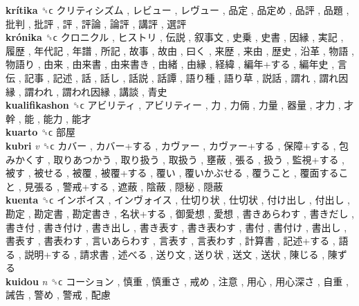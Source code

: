 \textbf{krítika} ␝ϲ   クリティシズム ,  レビュー ,  レヴュー ,  品定 ,  品定め ,  品評 ,  品題 ,  批判 ,  批評 ,  評 ,  評論 ,  論評 ,  講評 ,  選評   \\
\textbf{krónika} ␝ϲ   クロニクル ,  ヒストリ ,  伝説 ,  叙事文 ,  史乗 ,  史書 ,  因縁 ,  実記 ,  履歴 ,  年代記 ,  年譜 ,  所記 ,  故事 ,  故由 ,  曰く ,  来歴 ,  来由 ,  歴史 ,  沿革 ,  物語 ,  物語り ,  由来 ,  由来書 ,  由来書き ,  由緒 ,  由縁 ,  経緯 ,  編年+する ,  編年史 ,  言伝 ,  記事 ,  記述 ,  話 ,  話し ,  話説 ,  話譚 ,  語り種 ,  語り草 ,  説話 ,  謂れ ,  謂れ因縁 ,  謂われ ,  謂われ因縁 ,  講談 ,  青史   \\
\textbf{kualifikashon} ␝ϲ   アビリティ ,  アビリティー ,  力 ,  力倆 ,  力量 ,  器量 ,  才力 ,  才幹 ,  能 ,  能力 ,  能才   \\
\textbf{kuarto} ␝ϲ   部屋   \\
\textbf{kubri} \emph{v}  ␝ϲ   カバー ,  カバー+する ,  カヴァー ,  カヴァー+する ,  保障+する ,  包みかくす ,  取りあつかう ,  取り扱う ,  取扱う ,  壅蔽 ,  張る ,  扱う ,  監視+する ,  被す ,  被せる ,  被覆 ,  被覆+する ,  覆い ,  覆いかぶせる ,  覆うこと ,  覆面すること ,  見張る ,  警戒+する ,  遮蔽 ,  陰蔽 ,  隠秘 ,  隠蔽   \\
\textbf{kuenta} ␝ϲ   インボイス ,  インヴォイス ,  仕切り状 ,  仕切状 ,  付け出し ,  付出し ,  勘定 ,  勘定書 ,  勘定書き ,  名状+する ,  御愛想 ,  愛想 ,  書きあらわす ,  書きだし ,  書き付 ,  書き付け ,  書き出し ,  書き表す ,  書き表わす ,  書付 ,  書付け ,  書出し ,  書表す ,  書表わす ,  言いあらわす ,  言表す ,  言表わす ,  計算書 ,  記述+する ,  語る ,  説明+する ,  請求書 ,  述べる ,  送り文 ,  送り状 ,  送文 ,  送状 ,  陳じる ,  陳ずる   \\
\textbf{kuidou} \emph{n}  ␝ϲ   コーション ,  慎重 ,  慎重さ ,  戒め ,  注意 ,  用心 ,  用心深さ ,  自重 ,  誡告 ,  警め ,  警戒 ,  配慮   \\
